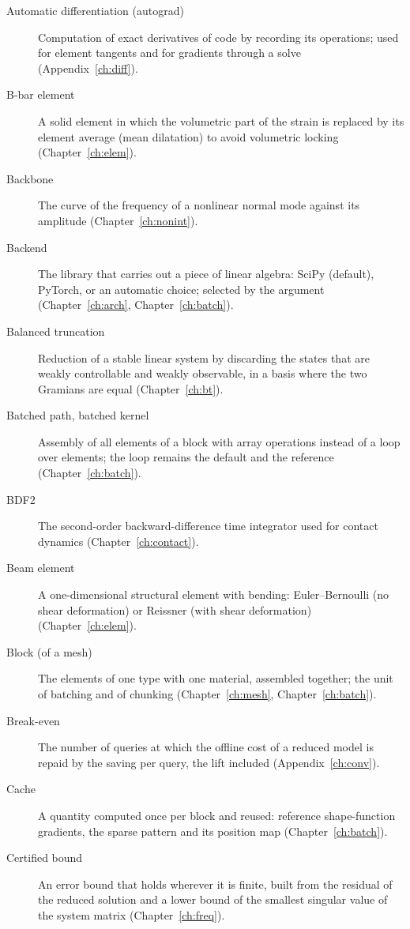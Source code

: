 \begin{description}
\item[Automatic differentiation (autograd)] Computation of exact derivatives of code by recording its operations; used for element tangents and for gradients through a solve (Appendix~\ref{ch:diff}).
\item[B-bar element] A solid element in which the volumetric part of the strain is replaced by its element average (mean dilatation) to avoid volumetric locking (Chapter~\ref{ch:elem}).
\item[Backbone] The curve of the frequency of a nonlinear normal mode against its amplitude (Chapter~\ref{ch:nonint}).
\item[Backend] The library that carries out a piece of linear algebra: SciPy (default), PyTorch, or an automatic choice; selected by the argument  (Chapter~\ref{ch:arch}, Chapter~\ref{ch:batch}).
\item[Balanced truncation] Reduction of a stable linear system by discarding the states that are weakly controllable and weakly observable, in a basis where the two Gramians are equal (Chapter~\ref{ch:bt}).
\item[Batched path, batched kernel] Assembly of all elements of a block with array operations instead of a loop over elements; the loop remains the default and the reference (Chapter~\ref{ch:batch}).
\item[BDF2] The second-order backward-difference time integrator used for contact dynamics (Chapter~\ref{ch:contact}).
\item[Beam element] A one-dimensional structural element with bending: Euler--Bernoulli (no shear deformation) or Reissner (with shear deformation) (Chapter~\ref{ch:elem}).
\item[Block (of a mesh)] The elements of one type with one material, assembled together; the unit of batching and of chunking (Chapter~\ref{ch:mesh}, Chapter~\ref{ch:batch}).
\item[Break-even] The number of queries at which the offline cost of a reduced model is repaid by the saving per query, the lift included (Appendix~\ref{ch:conv}).
\item[Cache] A quantity computed once per block and reused: reference shape-function gradients, the sparse pattern and its position map (Chapter~\ref{ch:batch}).
\item[Certified bound] An error bound that holds wherever it is finite, built from the residual of the reduced solution and a lower bound of the smallest singular value of the system matrix (Chapter~\ref{ch:freq}).

\end{description}
